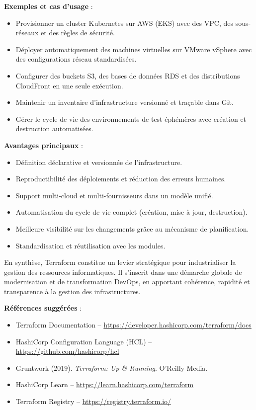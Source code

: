 \textbf{Exemples et cas d’usage} :
\begin{itemize}
	\item Provisionner un cluster Kubernetes sur AWS (EKS) avec des VPC, des sous-réseaux et des règles de sécurité.
	\item Déployer automatiquement des machines virtuelles sur VMware vSphere avec des configurations réseau standardisées.
	\item Configurer des buckets S3, des bases de données RDS et des distributions CloudFront en une seule exécution.
	\item Maintenir un inventaire d’infrastructure versionné et traçable dans Git.
	\item Gérer le cycle de vie des environnements de test éphémères avec création et destruction automatisées.
\end{itemize}

\textbf{Avantages principaux} :
\begin{itemize}
	\item Définition déclarative et versionnée de l’infrastructure.
	\item Reproductibilité des déploiements et réduction des erreurs humaines.
	\item Support multi-cloud et multi-fournisseurs dans un modèle unifié.
	\item Automatisation du cycle de vie complet (création, mise à jour, destruction).
	\item Meilleure visibilité sur les changements grâce au mécanisme de planification.
	\item Standardisation et réutilisation avec les modules.
\end{itemize}

En synthèse, Terraform constitue un levier stratégique pour industrialiser la gestion des ressources informatiques. Il s’inscrit dans une démarche globale de modernisation et de transformation DevOps, en apportant cohérence, rapidité et transparence à la gestion des infrastructures.

\textbf{Références suggérées} :
\begin{itemize}
	\item Terraform Documentation – \url{https://developer.hashicorp.com/terraform/docs}
	\item HashiCorp Configuration Language (HCL) – \url{https://github.com/hashicorp/hcl}
	\item Gruntwork (2019). \textit{Terraform: Up \& Running}. O’Reilly Media.
	\item HashiCorp Learn – \url{https://learn.hashicorp.com/terraform}
	\item Terraform Registry – \url{https://registry.terraform.io/}
\end{itemize}

